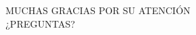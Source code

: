 \documentclass[aspectratio=169]{beamer}
\begin{document}
%
%
%
%
%
%
%


\begingroup
\makeatletter
\setlength{\hoffset}{-.5\beamer@sidebarwidth}
\makeatother
\begin{frame}
\fontsize{18pt}{15}\selectfont
\begin{center}
	MUCHAS GRACIAS POR SU ATENCIÓN\\
	\vspace{2cm}
	¿PREGUNTAS?
\end{center}
\end{frame}
\endgroup
\end{document}
